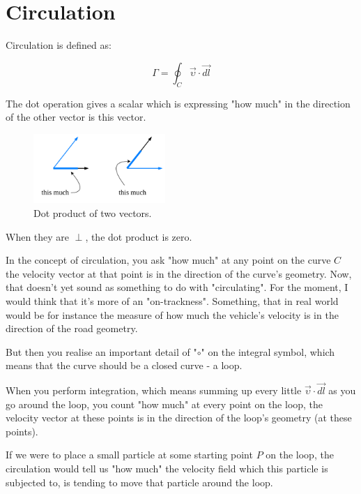 \documentclass[8pt, twocolumn]{extarticle}
\begin{document}
\setlength{\parskip}{0.6em}
\setlength{\parindent}{0cm}


\section{Circulation}

Circulation is defined as:

\begin{equation}
\Gamma = \oint_C \vec{\upsilon} \cdot \vec{dl}
\end{equation}

The dot operation gives a scalar which is expressing "how much" in the direction of the other vector is this vector.

\begin{figure}[H]
\centering\includegraphics[width=5cm]{circulation_dot_prod}
\caption{Dot product of two vectors.}			
\label{fig:learning_curve}
\end{figure}

When they are $\perp$, the dot product is zero.

In the concept of circulation, you ask "how much" at any point on the curve $C$ the velocity vector at that point is in the direction of the curve's geometry. Now, that doesn't yet sound as something to do with "circulating". For the moment, I would think that it's more of an "on-trackness". Something, that in real world would be for instance the measure of how much the vehicle's velocity is in the direction of the road geometry.

But then you realise an important detail of "$\circ$" on the integral symbol, which means that the curve should be a closed curve - a loop.

When you perform integration, which means summing up every little $\vec{\upsilon} \cdot \vec{dl}$ as you go around the loop, you count "how much" at every point on the loop, the velocity vector at these points is in the direction of the loop's geometry (at these points).

If we were to place a small particle at some starting point $P$ on the loop, the circulation would tell us "how much" the velocity field which this particle is subjected to, is tending to move that particle around the loop.
\end{document}
